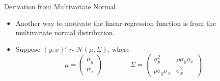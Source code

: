 \begin{frame}{Derivation from Multivariate Normal}
\begin{itemize}
	\item Another way to motivate the linear regression function is from the multivariate normal distribution.

	\smallskip
	\item Suppose $\left(y,x\right)' \sim \mathcal{N}\left(\mu,\Sigma\right)$, where\[
\mu=\left(\begin{array}{c}
\mu_{y}\\
\mu_{x}
\end{array}\right)\qquad\qquad\Sigma=\left(\begin{array}{cc}
\sigma_{y}^{2} & \rho\sigma_{y}\sigma_{x}\\
\rho\sigma_{y}\sigma_{x} & \sigma_{x}^{2}
\end{array}\right)
\]


\end{itemize}
\end{frame}



